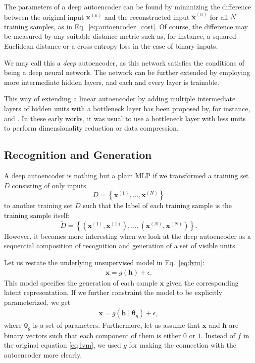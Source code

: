 \documentclass[dissertation,nocontribution,draft*]{aaltoseries}
\newcommand{\vect}[1]{\mathbf{#1}}
\newcommand{\vects}[1]{\boldsymbol{#1}}
\newcommand{\vh}[0]{\vect{h}}
\newcommand{\vx}[0]{\vect{x}}
\newcommand{\TT}[0]{{\vects{\theta}}}
\begin{document}
The parameters of a deep autoencoder can be found by
minimizing the difference between the original input
$\vx^{(n)}$ and the reconstructed input $\tilde{\vx}^{(n)}$
for all $N$ training samples, as in
Eq.~\eqref{eq:autoencoder_cost}. Of course, the difference
may be measured by any suitable distance metric such as, for
instance, a squared Euclidean distance or a cross-entropy
loss in the case of binary inputs.

We may call this a \textit{deep} autoencoder, as this
network satisfies the conditions of being a deep neural
network. The network can be further extended by employing
more intermediate hidden layers, and each and every layer is
trainable.

This way of extending a linear autoencoder by adding
multiple intermediate layers of hidden units with a
bottleneck layer has been proposed by, for instance,
\citet{Oja1991} and \citet{Kramer1991}. In these early
works, it was usual to use a bottleneck layer with less
units to perform 
dimensionality reduction or data compression.

\subsection{Recognition and Generation}
\label{sec:autoencoder_prob}

A deep autoencoder is nothing but a plain MLP if we
transformed a training set $D$ consisting of only inputs 
\[
D = \left\{ \vx^{(1)}, \dots, \vx^{(N)} \right\}
\]
to another training set $\tilde{D}$ such that the label of
each training sample is the training sample itself:
\[
\tilde{D} = \left\{ \left( \vx^{(1)}, \vx^{(1)}\right),
\dots, \left( \vx^{(N)}, \vx^{(N)}\right) \right\}.
\]
However, it becomes more interesting when we look at the
deep autoencoder as a sequential composition of recognition
and generation of a set of visible units.

Let us restate the underlying unsupervised model in
Eq.~\eqref{eq:lvm}:
\begin{align*}
    \vx = g(\vh) + \epsilon.
\end{align*}
This model specifies the generation of each sample $\vx$
given the corresponding latent representation. If we further
constraint the model to be explicitly parameterized, we get 
\begin{align*}
    \vx  = g(\vh \mid \TT_g) + \epsilon,
\end{align*}
where $\TT_g$ is a set of parameters. Furthermore, let us
assume that $\vx$ and $\vh$ are binary vectors such that
each component of them is either $0$ or $1$. Instead of $f$
in the original equation \eqref{eq:lvm}, we used $g$ for
making the connection with the autoencoder more clearly.
\end{document}
